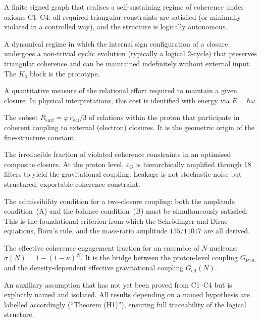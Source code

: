 \documentclass[11pt,a4paper]{article}
\theoremstyle{plain}
\theoremstyle{definition}
\theoremstyle{remark}
\newcommand{\Kfour}{K_4}
\newcommand{\Geff}{G_{\mathrm{eff}}}
\newcommand{\GPDL}{G_{\mathrm{PDL}}}
\newcommand{\epsG}{\varepsilon_G}
\newcommand{\rval}{r_{\mathrm{val}}}
\newcommand{\Rsurf}{R_{\mathrm{surf}}}
\begin{document}
\begin{description}[style=nextline, leftmargin=2.5cm]

\item[Closure]
A finite signed graph that realises a self-sustaining regime of coherence under axioms C1--C4: all required triangular constraints are satisfied (or minimally violated in a controlled way), and the structure is logically autonomous.

\item[Logical stationary regime]
A dynamical regime in which the internal sign configuration of a closure undergoes a non-trivial cyclic evolution (typically a logical 2-cycle) that preserves triangular coherence and can be maintained indefinitely without external input.
The $\Kfour$ block is the prototype.

\item[Coherence cost]
A quantitative measure of the relational effort required to maintain a given closure.
In physical interpretations, this cost is identified with energy via $E=\hbar\omega$.

\item[Active surface]
The subset $\Rsurf = \varphi\,\rval/3$ of relations within the proton that participate in coherent coupling to external (electron) closures.
It is the geometric origin of the fine-structure constant.

\item[Leakage ($\varepsilon$)]
The irreducible fraction of violated coherence constraints in an optimised composite closure.
At the proton level, $\epsG$ is hierarchically amplified through 18 filters to yield the gravitational coupling.
Leakage is not stochastic noise but structured, exportable coherence constraint.

\item[$(A)\wedge(B)$ coupling criterion]
The admissibility condition for a two-closure coupling: both the amplitude condition~(A) and the balance condition~(B) must be simultaneously satisfied.
This is the foundational criterion from which the Schr\"odinger and Dirac equations, Born's rule, and the mass-ratio amplitude $155/11017$ are all derived.

\item[$\sigma(N)$]
The effective coherence engagement fraction for an ensemble of $N$ nucleons: $\sigma(N)=1-(1-\kappa)^N$.
It is the bridge between the proton-level coupling $\GPDL$ and the density-dependent effective gravitational coupling $\Geff(N)$.

\item[Named hypothesis (H1, H2, \ldots)]
An auxiliary assumption that has not yet been proved from C1--C4 but is explicitly named and isolated.
All results depending on a named hypothesis are labelled accordingly (``Theorem (H1)''), ensuring full traceability of the logical structure.


\end{description}
\end{document}

